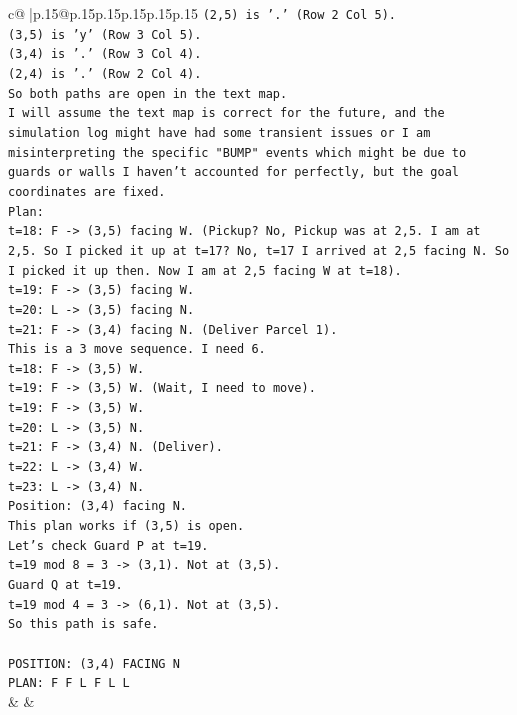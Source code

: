 \documentclass{article}
\begin{document}
{\begin{supertabular}{c@{$\;$}|p{.15\linewidth}@{}p{.15\linewidth}p{.15\linewidth}p{.15\linewidth}p{.15\linewidth}p{.15\linewidth}}
{{{\texttt{(2,5) is '.' (Row 2 Col 5).} \\
\texttt{(3,5) is 'y' (Row 3 Col 5).} \\
\texttt{(3,4) is '.' (Row 3 Col 4).} \\
\texttt{(2,4) is '.' (Row 2 Col 4).} \\
\texttt{So both paths are open in the text map.} \\
\texttt{I will assume the text map is correct for the future, and the simulation log might have had some transient issues or I am misinterpreting the specific "BUMP" events which might be due to guards or walls I haven't accounted for perfectly, but the goal coordinates are fixed.} \\
\texttt{Plan:} \\
\texttt{t=18: F {-}> (3,5) facing W. (Pickup? No, Pickup was at 2,5. I am at 2,5. So I picked it up at t=17? No, t=17 I arrived at 2,5 facing N. So I picked it up then. Now I am at 2,5 facing W at t=18).} \\
\texttt{t=19: F {-}> (3,5) facing W.} \\
\texttt{t=20: L {-}> (3,5) facing N.} \\
\texttt{t=21: F {-}> (3,4) facing N. (Deliver Parcel 1).} \\
\texttt{This is a 3 move sequence. I need 6.} \\
\texttt{t=18: F {-}> (3,5) W.} \\
\texttt{t=19: F {-}> (3,5) W. (Wait, I need to move).} \\
\texttt{t=19: F {-}> (3,5) W.} \\
\texttt{t=20: L {-}> (3,5) N.} \\
\texttt{t=21: F {-}> (3,4) N. (Deliver).} \\
\texttt{t=22: L {-}> (3,4) W.} \\
\texttt{t=23: L {-}> (3,4) N.} \\
\texttt{Position: (3,4) facing N.} \\
\texttt{This plan works if (3,5) is open.} \\
\texttt{Let's check Guard P at t=19.} \\
\texttt{t=19 mod 8 = 3 {-}> (3,1). Not at (3,5).} \\
\texttt{Guard Q at t=19.} \\
\texttt{t=19 mod 4 = 3 {-}> (6,1). Not at (3,5).} \\
\texttt{So this path is safe.} \\
\\ 
\texttt{POSITION: (3,4) FACING N} \\
\texttt{PLAN: F F L F L L} \\
            }
        }
    }
    & & \\ \\


\end{supertabular}}
\end{document}
